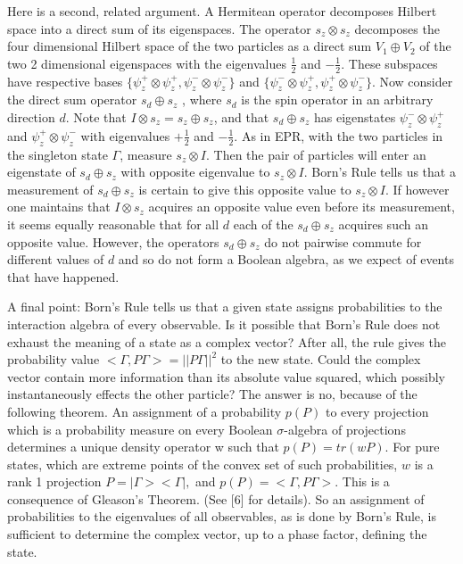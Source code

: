 \documentclass{article}
\begin{document}
Here is a second, related argument. A Hermitean operator decomposes  Hilbert space into a direct sum of its eigenspaces. The operator $s_z\otimes s_z$ decomposes the four dimensional Hilbert space of the two particles as a direct sum $V_1\oplus V_2$ of the two 2 dimensional eigenspaces with the eigenvalues $\frac{1}{2}$ and $-\frac{1}{2}$. These subspaces have respective bases  $\{\psi_z^+\otimes \psi_z^+, \psi_z^-\otimes \psi_z^-\}$ and $\{\psi_z^-\otimes\psi_z^+, \psi_z^+\otimes \psi_z^-\}$. Now consider the direct sum operator $s_d\oplus s_z$ , where $s_d$  is the spin operator in an arbitrary direction $d$. Note that  $I\otimes s_z =  s_z\oplus s_z$, and that $s_d\oplus s_z$ has eigenstates  $\psi_z^-\otimes \psi_z^+$ and $\psi_z^+\otimes\psi_z^-$ with eigenvalues $+\frac{1}{2}$ and $-\frac{1}{2}$. As in EPR, with the two particles in the singleton state $\Gamma$, measure $s_z\otimes I$. Then the pair of particles will enter an eigenstate of $s_d\oplus s_z$ with opposite eigenvalue to $s_z\otimes I.$  Born's Rule tells us that a measurement of $s_d\oplus s_z$ is certain to give this opposite value to $s_z\otimes I.$ If however one maintains that $I\otimes s_z$ acquires an opposite value even before its measurement, it seems equally reasonable that for all $d$ each of the $s_d\oplus s_z$ acquires such an opposite value. However, the operators $s_d\oplus s_z$ do not pairwise commute for different values of $d$ and so do not form a Boolean algebra, as we expect of events that have happened.

A final point: Born's Rule tells us that a given state assigns probabilities to the interaction algebra of every observable. Is it possible that Born's Rule does not exhaust the meaning of a state as a complex vector? After all, the rule gives the probability value $<\Gamma,  P \Gamma > = || P\Gamma ||^2$ to the new state. Could the complex vector contain more information than its absolute value squared, which possibly instantaneously effects the other particle? The answer is no, because of the following theorem. An assignment of a probability $p(P)$ to every projection which is a probability measure on every Boolean $\sigma$-algebra of projections determines a unique density operator w such that $p(P) = tr(wP)$. For pure states, which are extreme points of the convex set of such probabilities, $w$ is a rank 1 projection $P = | \Gamma ><\Gamma |,$ and $p(P) = < \Gamma, P \Gamma  >.$  This is a consequence of Gleason’s Theorem. (See [6] for details).  So an assignment of probabilities to the eigenvalues of all observables, as is done by Born's Rule, is sufficient to determine the complex vector, up to a phase factor, defining the state.                                                                                                      
\end{document}
